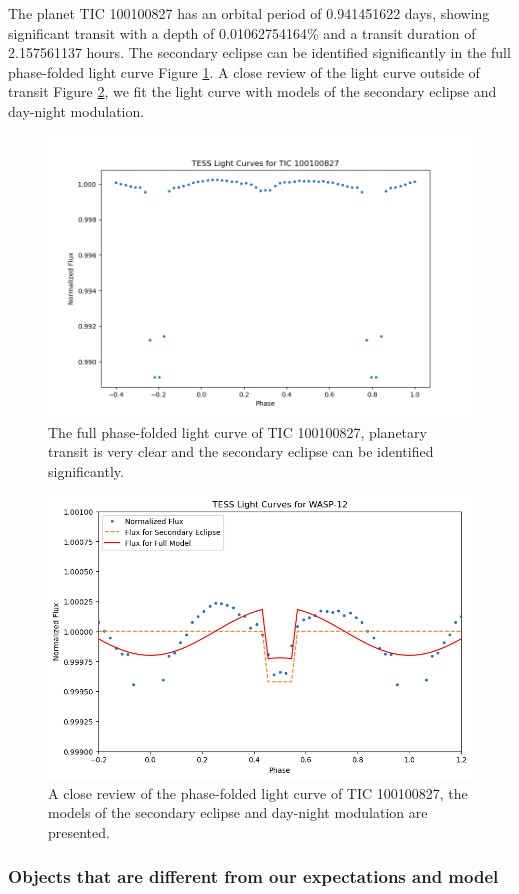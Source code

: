 \documentclass{article}
\begin{document}
The planet TIC 100100827 has an orbital period of 0.941451622 days, showing significant transit with a depth of 0.01062754164\% and a transit duration of 2.157561137 hours. The secondary eclipse can be identified significantly in the full phase-folded light curve Figure \ref{fig:100100827_folded}. A close review of the light curve outside of transit Figure \ref{fig:100100827}, we fit the light curve with models of the secondary eclipse and day-night modulation.\begin{figure}[H]\centering\includegraphics[width=0.7\linewidth]{image/100100827_folded.png}\captionsetup{font=small} \caption{The full phase-folded light curve of TIC 100100827, planetary transit is very clear and the secondary eclipse can be identified significantly.}\label{fig:100100827_folded}\end{figure}\begin{figure}[H]\centering\includegraphics[width=0.65\linewidth]{image/100100827.png}\captionsetup{font=small} \caption{A close review of the phase-folded light curve of TIC 100100827, the models of the secondary eclipse and day-night modulation are presented.}\label{fig:100100827}\end{figure}
\newpage
\subsubsection{Objects that are different from our expectations and model}
\end{document}
